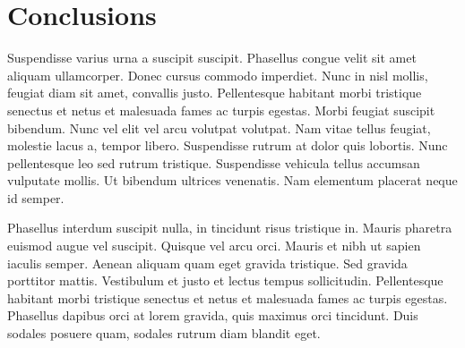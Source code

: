 \chapter{Conclusions}
Suspendisse varius urna a suscipit suscipit. Phasellus congue velit sit amet aliquam ullamcorper. Donec cursus commodo imperdiet. Nunc in nisl mollis, feugiat diam sit amet, convallis justo. Pellentesque habitant morbi tristique senectus et netus et malesuada fames ac turpis egestas. Morbi feugiat suscipit bibendum. Nunc vel elit vel arcu volutpat volutpat. Nam vitae tellus feugiat, molestie lacus a, tempor libero. Suspendisse rutrum at dolor quis lobortis. Nunc pellentesque leo sed rutrum tristique. Suspendisse vehicula tellus accumsan vulputate mollis. Ut bibendum ultrices venenatis. Nam elementum placerat neque id semper.

Phasellus interdum suscipit nulla, in tincidunt risus tristique in. Mauris pharetra euismod augue vel suscipit. Quisque vel arcu orci. Mauris et nibh ut sapien iaculis semper. Aenean aliquam quam eget gravida tristique. Sed gravida porttitor mattis. Vestibulum et justo et lectus tempus sollicitudin. Pellentesque habitant morbi tristique senectus et netus et malesuada fames ac turpis egestas. Phasellus dapibus orci at lorem gravida, quis maximus orci tincidunt. Duis sodales posuere quam, sodales rutrum diam blandit eget.